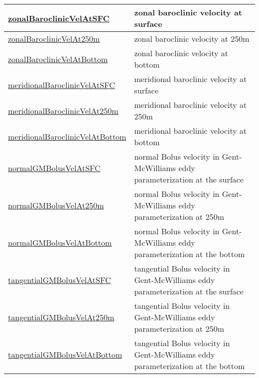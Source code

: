{\begin{center}
\begin{longtable}{| p{2.0in} | p{4.0in} |}
    \hline
    \hyperref[subsec:var_sec_highFrequencyOutputAM_zonalBaroclinicVelAtSFC]{zonalBaroclinicVelAtSFC} & zonal baroclinic velocity at surface \\
    \hline
    \hyperref[subsec:var_sec_highFrequencyOutputAM_zonalBaroclinicVelAt250m]{zonalBaroclinicVelAt250m} & zonal baroclinic velocity at 250m \\
    \hline
    \hyperref[subsec:var_sec_highFrequencyOutputAM_zonalBaroclinicVelAtBottom]{zonalBaroclinicVelAtBottom} & zonal baroclinic velocity at bottom \\
    \hline
    \hyperref[subsec:var_sec_highFrequencyOutputAM_meridionalBaroclinicVelAtSFC]{meridionalBaroclinicVelAtSFC} & meridional baroclinic velocity at surface \\
    \hline
    \hyperref[subsec:var_sec_highFrequencyOutputAM_meridionalBaroclinicVelAt250m]{meridionalBaroclinicVelAt250m} & meridional baroclinic velocity at 250m \\
    \hline
    \hyperref[subsec:var_sec_highFrequencyOutputAM_meridionalBaroclinicVelAtBottom]{meridionalBaroclinicVelAtBottom} & meridional baroclinic velocity at bottom \\
    \hline
    \hyperref[subsec:var_sec_highFrequencyOutputAM_normalGMBolusVelAtSFC]{normalGMBolusVelAtSFC} & normal Bolus velocity in Gent-McWilliams eddy parameterization at the surface \\
    \hline
    \hyperref[subsec:var_sec_highFrequencyOutputAM_normalGMBolusVelAt250m]{normalGMBolusVelAt250m} & normal Bolus velocity in Gent-McWilliams eddy parameterization at 250m \\
    \hline
    \hyperref[subsec:var_sec_highFrequencyOutputAM_normalGMBolusVelAtBottom]{normalGMBolusVelAtBottom} & normal Bolus velocity in Gent-McWilliams eddy parameterization at the bottom \\
    \hline
    \hyperref[subsec:var_sec_highFrequencyOutputAM_tangentialGMBolusVelAtSFC]{tangentialGMBolusVelAtSFC} & tangential Bolus velocity in Gent-McWilliams eddy parameterization at the surface \\
    \hline
    \hyperref[subsec:var_sec_highFrequencyOutputAM_tangentialGMBolusVelAt250m]{tangentialGMBolusVelAt250m} & tangential Bolus velocity in Gent-McWilliams eddy parameterization at 250m \\
    \hline
    \hyperref[subsec:var_sec_highFrequencyOutputAM_tangentialGMBolusVelAtBottom]{tangentialGMBolusVelAtBottom} & tangential Bolus velocity in Gent-McWilliams eddy parameterization at the bottom \\

\end{longtable}
\end{center}}
